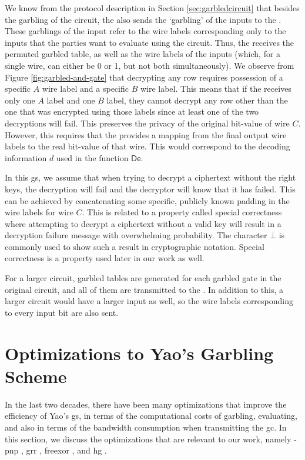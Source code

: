 We know from the protocol description in Section \ref{sec:garbledcircuit} that besides the garbling of the circuit, the \cgarbler also sends the `garbling' of the inputs to the \cevaluator. These garblings of the input refer to the wire labels corresponding only to the inputs that the parties want to evaluate using the circuit. Thus, the \cevaluator receives the permuted garbled table, as well as the wire labels of the inputs (which, for a single wire, can either be 0 or 1, but not both simultaneously). We observe from Figure \ref{fig:garbled-and-gate} that decrypting any row requires possession of a specific $A$ wire label and a specific $B$ wire label. This means that if the \cevaluator receives only one $A$ label and one $B$ label, they cannot decrypt any row other than the one that was encrypted using those labels since at least one of the two decryptions will fail. This preserves the privacy of the original bit-value of wire $C$. However, this requires that the \cgarbler provides a mapping from the final output wire labels to the real bit-value of that wire. This would correspond to the decoding information $d$ used in the function $\mathsf{De}$. 

In this \acrlong{gs}, we assume that when trying to decrypt a ciphertext without the right keys, the decryption will fail and the decryptor will know that it has failed. This can be achieved by concatenating some specific, publicly known padding in the wire labels for wire $C$. This is related to a property called special correctness where attempting to decrypt a ciphertext without a valid key will result in a decryption failure message with overwhelming probability. The character $\bot$ is commonly used to show such a result in cryptographic notation. Special correctness is a property used later in our work as well.


For a larger circuit, garbled tables are generated for each garbled gate in the original circuit, and all of them are transmitted to the \cevaluator. In addition to this, a larger circuit would have a larger input as well, so the wire labels corresponding to every input bit are also sent.

\section{Optimizations to Yao's Garbling Scheme}
\label{sec:garblingoptimizations}

In the last two decades, there have been many optimizations that improve the efficiency of Yao's \acrlong{gs}, in terms of the computational costs of garbling, evaluating, and also in terms of the bandwidth consumption when transmitting the \acrlong{gc}. In this section, we discuss the optimizations that are relevant to our work, namely - \acrfull{pnp} \cite{STOC:BeaMicRog90}, \acrfull{grr} \cite{ACMCEC:NaPiSu99}, \acrlong{freexor} \cite{ALP:KolSch08}, and \acrlong{hg} \cite{EC:ZahRosEva15}. 
